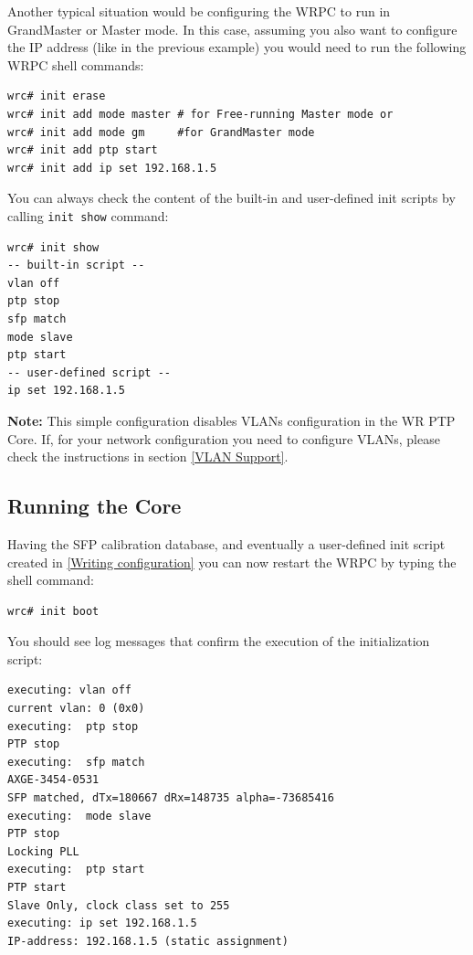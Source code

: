 \documentclass[a4paper, 12pt]{article}
\renewcommand{\_}{\underscore\allowbreak}
\begin{document}
Another typical situation would be configuring the WRPC to run in GrandMaster or
Master mode. In this case, assuming you also want to configure the IP address
(like in the previous example) you would need to run the following WRPC shell
commands:
\begin{lstlisting}
wrc# init erase
wrc# init add mode master # for Free-running Master mode or
wrc# init add mode gm     #for GrandMaster mode
wrc# init add ptp start
wrc# init add ip set 192.168.1.5
\end{lstlisting}

You can always check the content of the built-in and user-defined init scripts
by calling \texttt{init show} command:
\begin{lstlisting}
wrc# init show
-- built-in script --
vlan off
ptp stop
sfp match
mode slave
ptp start
-- user-defined script --
ip set 192.168.1.5
\end{lstlisting}

\noindent\textbf{Note:} This simple configuration disables VLANs configuration
in the WR PTP Core. If, for your network configuration you need to configure
VLANs, please check the instructions in section \ref{VLAN Support}.

\subsection{Running the Core}
\label{Running the Core}

Having the SFP calibration database, and eventually a user-defined init script
created in \ref{Writing configuration} you can now restart the WRPC by typing
the shell command:

\begin{lstlisting}
wrc# init boot
\end{lstlisting}

You should see log messages that confirm the execution of the initialization
script:
\begin{minipage}{\textwidth}
\begin{lstlisting}
executing: vlan off
current vlan: 0 (0x0)
executing:  ptp stop
PTP stop
executing:  sfp match
AXGE-3454-0531  
SFP matched, dTx=180667 dRx=148735 alpha=-73685416
executing:  mode slave
PTP stop
Locking PLL
executing:  ptp start
PTP start
Slave Only, clock class set to 255
executing: ip set 192.168.1.5
IP-address: 192.168.1.5 (static assignment)
\end{lstlisting}
\end{minipage}
\end{document}
